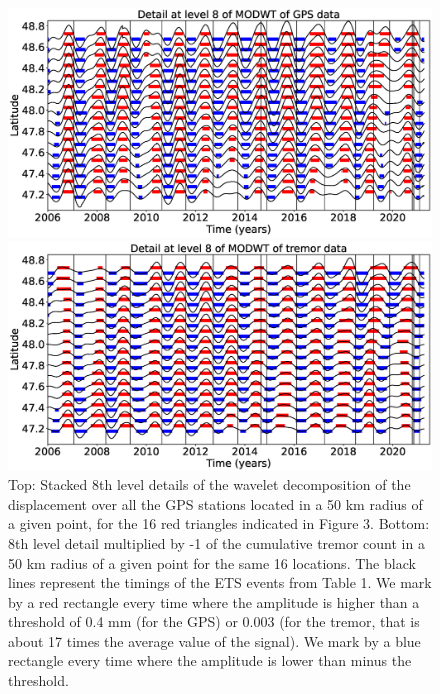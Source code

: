 \documentclass{article}
\begin{document}
\begin{figure}
\noindent\includegraphics[width=\textwidth, trim={0cm 0cm 0cm 0cm},clip]{figures/GPS_longer_detail_8.eps}

\noindent\includegraphics[width=\textwidth, trim={0cm 0cm 0cm 0cm},clip]{figures/tremor_longer_detail_8.eps}
\caption{Top: Stacked 8th level details of the wavelet decomposition of the displacement over all the GPS stations located in a 50 km radius of a given point, for the 16 red triangles indicated in Figure 3. Bottom: 8th level detail multiplied by -1 of the cumulative tremor count in a 50 km radius of a given point for the same 16 locations. The black lines represent the timings of the ETS events from Table 1. We mark by a red rectangle every time where the amplitude is higher than a threshold of 0.4 mm (for the GPS) or 0.003 (for the tremor, that is about 17 times the average value of the signal). We mark by a blue rectangle every time where the amplitude is lower than minus the threshold.}
\label{pngfiguresample}
\end{figure}
\end{document}
